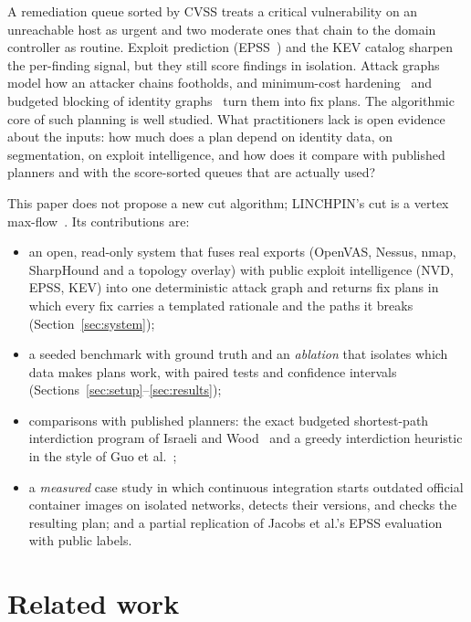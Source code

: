 \documentclass[11pt]{article}
\begin{document}
A remediation queue sorted by CVSS treats a critical vulnerability on an unreachable host as urgent and two moderate
ones that chain to the domain controller as routine. Exploit prediction (EPSS~\cite{jacobs2021epss}) and the KEV
catalog sharpen the per-finding signal, but they still score findings in isolation. Attack graphs~\cite{phillips1998graph,sheyner2002automated,ou2005mulval}
model how an attacker chains footholds, and minimum-cost hardening~\cite{noel2003efficient,wang2006minimum,albanese2012time}
and budgeted blocking of identity graphs~\cite{dunagan2009heatray,guo2022practical,guo2023scalable} turn them into fix
plans. The algorithmic core of such planning is well studied. What practitioners lack is open evidence about the
inputs: how much does a plan depend on identity data, on segmentation, on exploit intelligence, and how does it compare
with published planners and with the score-sorted queues that are actually used?

This paper does not propose a new cut algorithm; LINCHPIN's cut is a vertex max-flow~\cite{ford1956maximal}. Its
contributions are:
\begin{itemize}
  \item an open, read-only system that fuses real exports (OpenVAS, Nessus, nmap, SharpHound and a topology overlay)
        with public exploit intelligence (NVD, EPSS, KEV) into one deterministic attack graph and returns fix plans in
        which every fix carries a templated rationale and the paths it breaks (Section~\ref{sec:system});
  \item a seeded benchmark with ground truth and an \emph{ablation} that isolates which data makes plans work, with
        paired tests and confidence intervals (Sections~\ref{sec:setup}--\ref{sec:results});
  \item comparisons with published planners: the exact budgeted shortest-path interdiction program of Israeli and
        Wood~\cite{israeli2002shortest} and a greedy interdiction heuristic in the style of Guo et
        al.~\cite{guo2023scalable};
  \item a \emph{measured} case study in which continuous integration starts outdated official container images on
        isolated networks, detects their versions, and checks the resulting plan; and a partial replication of
        Jacobs et al.'s EPSS evaluation~\cite{jacobs2023enhancing} with public labels.
\end{itemize}

\section{Related work}
\label{sec:related}
\end{document}
